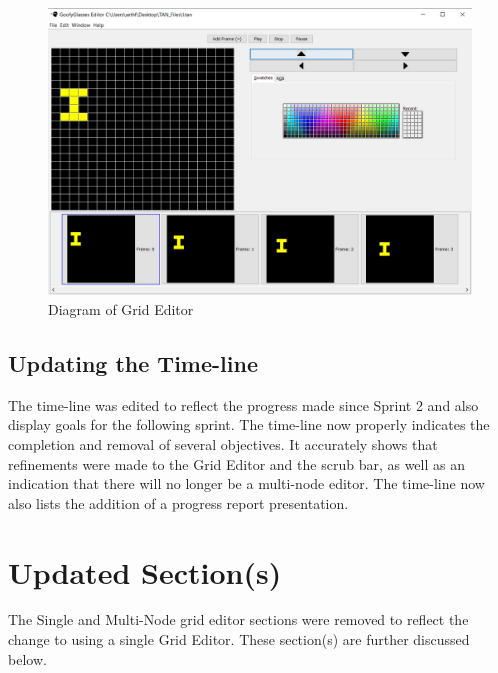 \documentclass[12pt]{article}
\begin{document}
      \begin{figure}[ht!]
        \centering
        \includegraphics[width=120mm]{gridEditor_ColorPicker.PNG}
        \caption{Diagram of Grid Editor}
      \end{figure}
    
			\subsection {Updating the Time-line}
			\forceindent The time-line was edited to reflect the progress made since Sprint 2 and also display goals for the following sprint. The time-line now properly indicates the completion and removal of several objectives. It accurately shows that refinements were made to the Grid Editor and the scrub bar, as well as an indication that there will no longer be a multi-node editor. The time-line now also lists the addition of a progress report presentation.
      
			\newpage
		
		\section{Updated Section(s)}
		\forceindent The Single and Multi-Node grid editor sections were removed to reflect the change to using a single Grid Editor. These section(s) are further discussed below.
		
\end{document}
